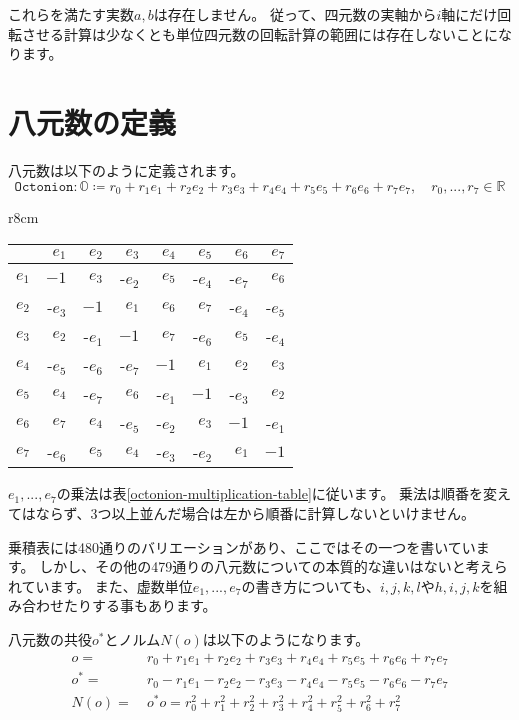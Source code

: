 \documentclass[a4paper,12pt,notitlepage]{jsreport}
\begin{document}
これらを満たす実数$a,b$は存在しません。
従って、四元数の実軸から$i$軸にだけ回転させる計算は少なくとも単位四元数の回転計算の範囲には存在しないことになります。

\section{八元数の定義}

八元数は以下のように定義されます。
\begin{equation}
\texttt{Octonion}:\mathbb{O}\coloneq r_0+r_1e_1+r_2e_2+r_3e_3+r_4e_4+r_5e_5+r_6e_6+r_7e_7,
\quad r_0,...,r_7\in\mathbb{R}
\end{equation}

\begin{wraptable}{r}{8cm}
\caption{乗積表\label{octonion-multiplication-table}}
\centering
\begin{tabular}{rrrrrrrr}\hline
     & $e_1$& $e_2$& $e_3$& $e_4$& $e_5$& $e_6$& $e_7$\\\hline
$e_1$& $ -1$& $e_3$&-$e_2$& $e_5$&-$e_4$&-$e_7$& $e_6$\\\hline
$e_2$&-$e_3$& $ -1$& $e_1$& $e_6$& $e_7$&-$e_4$&-$e_5$\\\hline
$e_3$& $e_2$&-$e_1$& $ -1$& $e_7$&-$e_6$& $e_5$&-$e_4$\\\hline
$e_4$&-$e_5$&-$e_6$&-$e_7$& $ -1$& $e_1$& $e_2$& $e_3$\\\hline
$e_5$& $e_4$&-$e_7$& $e_6$&-$e_1$& $ -1$&-$e_3$& $e_2$\\\hline
$e_6$& $e_7$& $e_4$&-$e_5$&-$e_2$& $e_3$& $ -1$&-$e_1$\\\hline
$e_7$&-$e_6$& $e_5$& $e_4$&-$e_3$&-$e_2$& $e_1$& $ -1$\\\hline
\end{tabular}
\end{wraptable}

$e_1,...,e_7$の乗法は表\ref{octonion-multiplication-table}に従います。
乗法は順番を変えてはならず、3つ以上並んだ場合は左から順番に計算しないといけません。

乗積表には480通りのバリエーションがあり、ここではその一つを書いています。
しかし、その他の479通りの八元数についての本質的な違いはないと考えられています。
また、虚数単位$e_1,...,e_7$の書き方についても、$i,j,k,l$や$h,i,j,k$を組み合わせたりする事もあります。

八元数の共役$o^*$とノルム$N(o)$は以下のようになります。
\begin{equation}
\begin{split}
o=~&r_0+r_1e_1+r_2e_2+r_3e_3+r_4e_4+r_5e_5+r_6e_6+r_7e_7\\
o^*=~&r_0-r_1e_1-r_2e_2-r_3e_3-r_4e_4-r_5e_5-r_6e_6-r_7e_7\\
N(o)=~&o^*o=r_0^2+r_1^2+r_2^2+r_3^2+r_4^2+r_5^2+r_6^2+r_7^2
\end{split}
\end{equation}
\end{document}
